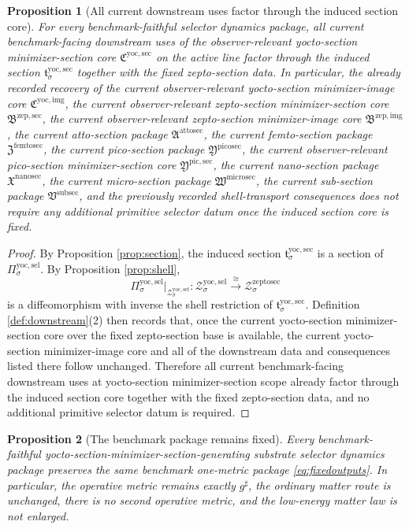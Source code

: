\documentclass[11pt]{article}
\newcommand{\CompletedMetric}{g^{\sharp}}
\newcommand{\SubSectionPackage}{\mathfrak V^{\mathrm{subsec}}}
\newcommand{\MicroSectionPackage}{\mathfrak W^{\mathrm{microsec}}}
\newcommand{\NanoSectionPackage}{\mathfrak X^{\mathrm{nanosec}}}
\newcommand{\PicoSectionPackage}{\mathfrak Y^{\mathrm{picosec}}}
\newcommand{\PicoMinSectionCore}{\mathfrak Y^{\mathrm{pic,sec}}}
\newcommand{\FemtoSectionPackage}{\mathfrak Z^{\mathrm{femtosec}}}
\newcommand{\AttoSectionPackage}{\mathfrak A^{\mathrm{attosec}}}
\newcommand{\ZeptoImageCore}{\mathfrak B^{\mathrm{zep,img}}}
\newcommand{\ZeptoMinSectionCore}{\mathfrak B^{\mathrm{zep,sec}}}
\newcommand{\ZeptoSectionShell}[1]{\mathcal Z_{#1}^{\mathrm{zeptosec}}}
\newcommand{\YoctoImageCore}{\mathfrak C^{\mathrm{yoc,img}}}
\newcommand{\YoctoMinSectionCore}{\mathfrak C^{\mathrm{yoc,sec}}}
\newcommand{\YoctoMinSection}[1]{\mathfrak t_{#1}^{\mathrm{yoc,sec}}}
\newcommand{\YoctoSelectorProj}[1]{\Pi_{#1}^{\mathrm{yoc,sel}}}
\newcommand{\YoctoSelectorShell}[1]{\mathcal Z_{#1}^{\mathrm{yoc,sel}}}
\newtheorem{proposition}{Proposition}
\begin{document}
\begin{proposition}[All current downstream uses factor through the induced section core]
\label{prop:downstream}
For every benchmark-faithful selector dynamics package, all current benchmark-facing downstream uses of the observer-relevant yocto-section minimizer-section core \(\YoctoMinSectionCore\) on the active line factor through the induced section \(\YoctoMinSection{\sigma}\) together with the fixed zepto-section data. In particular, the already recorded recovery of the current observer-relevant yocto-section minimizer-image core \(\YoctoImageCore\), the current observer-relevant zepto-section minimizer-section core \(\ZeptoMinSectionCore\), the current observer-relevant zepto-section minimizer-image core \(\ZeptoImageCore\), the current atto-section package \(\AttoSectionPackage\), the current femto-section package \(\FemtoSectionPackage\), the current pico-section package \(\PicoSectionPackage\), the current observer-relevant pico-section minimizer-section core \(\PicoMinSectionCore\), the current nano-section package \(\NanoSectionPackage\), the current micro-section package \(\MicroSectionPackage\), the current sub-section package \(\SubSectionPackage\), and the previously recorded shell-transport consequences does not require any additional primitive selector datum once the induced section core is fixed.
\end{proposition}

\begin{proof}
By Proposition \ref{prop:section}, the induced section \(\YoctoMinSection{\sigma}\) is a section of \(\YoctoSelectorProj{\sigma}\). By Proposition \ref{prop:shell},
\[
\YoctoSelectorProj{\sigma}\big|_{\YoctoSelectorShell{\sigma}}
:
\YoctoSelectorShell{\sigma}\xrightarrow{\cong}\ZeptoSectionShell{\sigma}
\]
is a diffeomorphism with inverse the shell restriction of \(\YoctoMinSection{\sigma}\). Definition \ref{def:downstream}(2) then records that, once the current yocto-section minimizer-section core over the fixed zepto-section base is available, the current yocto-section minimizer-image core and all of the downstream data and consequences listed there follow unchanged. Therefore all current benchmark-facing downstream uses at yocto-section minimizer-section scope already factor through the induced section core together with the fixed zepto-section data, and no additional primitive selector datum is required.
\end{proof}

\begin{proposition}[The benchmark package remains fixed]
\label{prop:benchmark}
Every benchmark-faithful yocto-section-minimizer-section-generating substrate selector dynamics package preserves the same benchmark one-metric package \eqref{eq:fixedoutputs}. In particular, the operative metric remains exactly \(\CompletedMetric\), the ordinary matter route is unchanged, there is no second operative metric, and the low-energy matter law is not enlarged.
\end{proposition}
\end{document}
